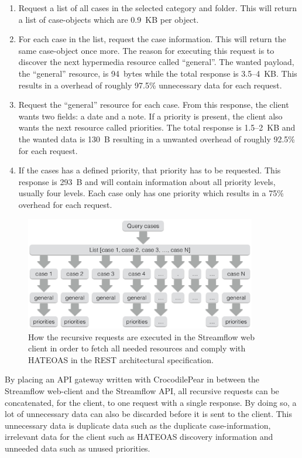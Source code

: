 \documentclass{cslthse-msc}
\begin{document}
\begin{enumerate}
	\item Request a list of all cases in the selected category and folder. This will return a list of case-objects which are 0.9~KB per object.
	\item For each case in the list, request the case information. This will return the same case-object once more. The reason for executing this request is to discover the next hypermedia resource called \enquote{general}. The wanted payload, the \enquote{general} resource, is 94~bytes while the total response is 3.5--4~KB. This results in a overhead of roughly 97.5\% unnecessary data for each request.
	\item Request the \enquote{general} resource for each case. From this response, the client wants two fields: a date and a note. If a priority is present, the client also wants the next resource called priorities. The total response is 1.5--2~KB and the wanted data is 130~B resulting in a unwanted overhead of roughly 92.5\% for each request.
	\item If the cases has a defined priority, that priority has to be requested. This response is 293~B and will contain information about all priority levels, usually four levels. Each case only has one priority which results in a 75\% overhead for each request.
\end{enumerate}

\begin{figure}[H]
  \centering
    \begin{center}
      \includegraphics[width=0.9\textwidth]{images/streamflow_cases.png}
    \end{center}
  \caption{How the recursive requests are executed in the Streamflow web client in order to fetch all needed resources and comply with HATEOAS in the REST architectural specification.}
\end{figure}

By placing an API gateway written with CrocodilePear in between the Streamflow web-client and the Streamflow API, all recursive requests can be concatenated, for the client, to one request with a single response. By doing so, a lot of unnecessary data can also be discarded before it is sent to the client. This unnecessary data is duplicate data such as the duplicate case-information, irrelevant data for the client such as HATEOAS discovery information and unneeded data such as unused priorities.
\end{document}
